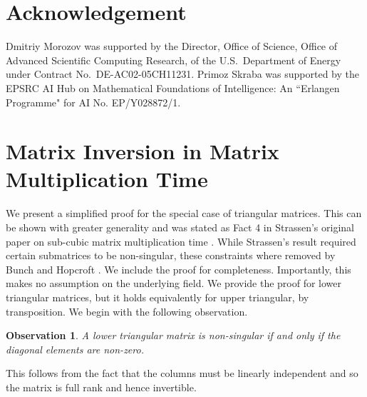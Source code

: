 \documentclass{article}
\newtheorem{observation}[theorem]{Observation}
\begin{document}
\section*{Acknowledgement}
Dmitriy Morozov was supported by the Director, Office of Science, Office of Advanced Scientific
 Computing Research, of the U.S.\ Department of Energy under Contract No.\ DE-AC02-05CH11231.
Primoz Skraba was supported by the EPSRC AI Hub on Mathematical Foundations of Intelligence: An ``Erlangen Programme" for AI No. EP/Y028872/1.




\appendix




\section{Matrix Inversion in Matrix Multiplication Time}\label{appendix:fastinversion}

We present a simplified proof for the special case of triangular matrices. This can be shown with greater generality and was stated as Fact 4 in Strassen's original
paper on sub-cubic matrix multiplication time \cite{strassen1969gaussian}. While Strassen's result required certain submatrices to be non-singular, these constraints where removed by Bunch and Hopcroft \cite{bunch1974triangular}. We include the proof for completeness.  Importantly, this makes no assumption on the underlying field. 
%
We provide the proof for lower triangular matrices, but it holds equivalently for upper triangular, by transposition. 
 We begin with the following observation.
 \begin{observation}
 A  lower triangular matrix is non-singular if and only if the diagonal elements are non-zero.
 \end{observation}
 This follows from the fact that the columns must be linearly independent and so the matrix is full rank and hence invertible. 
\end{document}
